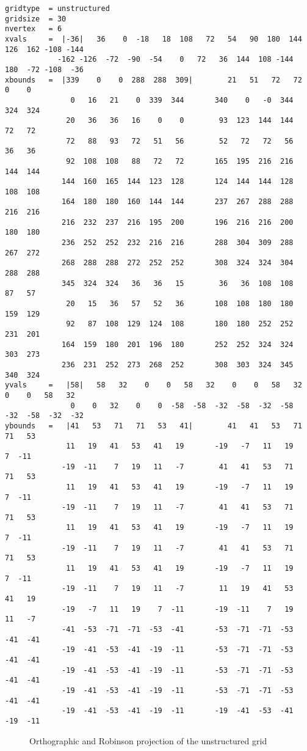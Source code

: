 \begin{lstlisting}[frame=single, backgroundcolor=\color{pcolor1}, basicstyle=\footnotesize]
gridtype  = unstructured
gridsize  = 30
nvertex   = 6
xvals     =  |-36|   36    0  -18   18  108   72   54   90  180  144  126  162 -108 -144 
            -162 -126  -72  -90  -54    0   72   36  144  108 -144  180  -72 -108  -36 
xbounds   =  |339    0    0  288  288  309|        21   51   72   72    0    0
               0   16   21    0  339  344       340    0   -0  344  324  324
              20   36   36   16    0    0        93  123  144  144   72   72
              72   88   93   72   51   56        52   72   72   56   36   36
              92  108  108   88   72   72       165  195  216  216  144  144
             144  160  165  144  123  128       124  144  144  128  108  108
             164  180  180  160  144  144       237  267  288  288  216  216
             216  232  237  216  195  200       196  216  216  200  180  180
             236  252  252  232  216  216       288  304  309  288  267  272
             268  288  288  272  252  252       308  324  324  304  288  288
             345  324  324   36   36   15        36   36  108  108   87   57
              20   15   36   57   52   36       108  108  180  180  159  129
              92   87  108  129  124  108       180  180  252  252  231  201
             164  159  180  201  196  180       252  252  324  324  303  273
             236  231  252  273  268  252       308  303  324  345  340  324
yvals     =   |58|   58   32    0    0   58   32    0    0   58   32    0    0   58   32 
               0    0   32    0    0  -58  -58  -32  -58  -32  -58  -32  -58  -32  -32 
ybounds   =   |41   53   71   71   53   41|        41   41   53   71   71   53
              11   19   41   53   41   19       -19   -7   11   19    7  -11
             -19  -11    7   19   11   -7        41   41   53   71   71   53
              11   19   41   53   41   19       -19   -7   11   19    7  -11
             -19  -11    7   19   11   -7        41   41   53   71   71   53
              11   19   41   53   41   19       -19   -7   11   19    7  -11
             -19  -11    7   19   11   -7        41   41   53   71   71   53
              11   19   41   53   41   19       -19   -7   11   19    7  -11
             -19  -11    7   19   11   -7        11   19   41   53   41   19
             -19   -7   11   19    7  -11       -19  -11    7   19   11   -7
             -41  -53  -71  -71  -53  -41       -53  -71  -71  -53  -41  -41
             -19  -41  -53  -41  -19  -11       -53  -71  -71  -53  -41  -41
             -19  -41  -53  -41  -19  -11       -53  -71  -71  -53  -41  -41
             -19  -41  -53  -41  -19  -11       -53  -71  -71  -53  -41  -41
             -19  -41  -53  -41  -19  -11       -19  -41  -53  -41  -19  -11
\end{lstlisting}

\begin{figure}[b]

\caption[cellgrid]{Orthographic and Robinson projection of the unstructured grid}
\end{figure}

